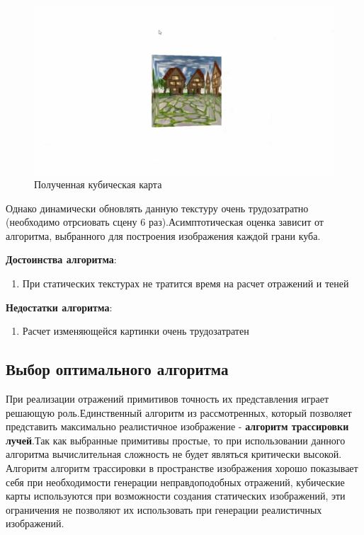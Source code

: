 \documentclass[a4paper,14pt, unknownkeysallowed]{extreport}
\begin{document}
\begin{figure}[H]
	\centering
	\includegraphics[scale=0.4]{cube_maps_real_example}
	\caption{Полученная кубическая карта}
	\label{fig:cube_maps_real_example}
\end{figure}


Однако динамически обновлять данную текстуру очень трудозатратно (необходимо отрсиовать сцену 6 раз).Асимптотическая оценка зависит от алгоритма, выбранного для построения изображения каждой грани куба.


\textbf{Достоинства алгоритма}:
\begin{enumerate}
	\item При статических текстурах не тратится время на расчет отражений и теней
\end{enumerate}

\textbf{Недостатки алгоритма}:
\begin{enumerate}
	\item Расчет изменяющейся картинки очень трудозатратен
\end{enumerate}

\subsection{Выбор оптимального алгоритма}
При реализации отражений примитивов точность их представления играет решающую роль.Единственный алгоритм из рассмотренных, который позволяет представить максимально
реалистичное изображение - \textbf{алгоритм трассировки лучей}.Так как выбранные примитивы простые, то при использовании данного алгоритма вычислительная
сложность не будет являться критически высокой. Алгоритм алгоритм трассировки в пространстве изображения хорошо показывает себя при необходимости генерации неправдоподобных отражений, кубические карты
используются при возможности создания статических изображений, эти ограничения не позволяют их использовать при генерации реалистичных изображений.
\end{document}
